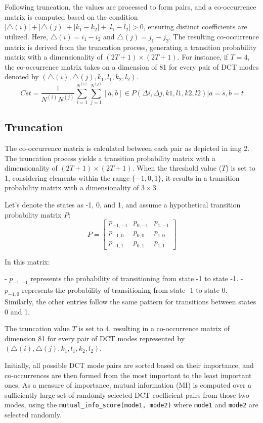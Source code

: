 Following truncation, the values are processed to form pairs, and a co-occurrence matrix is computed based on the condition $|\triangle(i)| + |\triangle(j)| + |k_1 - k_2| + |l_1 - l_2| > 0$, ensuring distinct coefficients are utilized. Here, $\triangle(i) = i_1 - i_2$ and $\triangle(j) = j_1 - j_2$. The resulting co-occurrence matrix is derived from the truncation process, generating a transition probability matrix with a dimensionality of $(2T + 1) \times (2T + 1)$. For instance, if $T = 4$, the co-occurrence matrix takes on a dimension of 81 for every pair of DCT modes denoted by $(\triangle(i), \triangle(j), k_1, l_1, k_2, l_2)$.
\[
    Cst = \frac{1}{N^{(i)}N^{(j)}} \sum_{i=1}^{N^{(i)}} \sum_{j=1}^{N^{(j)}} \left[ a, b \right] \in P (\Delta i, \Delta j, k1, l1, k2, l2) | a = s, b = t
\]

\subsection*{Truncation}
The co-occurrence matrix is calculated between each pair as depicted in img 2. The truncation process yields a transition probability matrix with a dimensionality of $(2T + 1) \times (2T + 1)$. When the threshold value ($T$) is set to 1, considering elements within the range $\{-1, 0, 1\}$, it results in a transition probability matrix with a dimensionality of $3 \times 3$.

Let's denote the states as -1, 0, and 1, and assume a hypothetical transition probability matrix $P$:
\[
    P = \begin{bmatrix}
        p_{-1,-1} & p_{0,-1} & p_{1,-1} \\
        p_{-1,0}  & p_{0,0}  & p_{1,0}  \\
        p_{-1,1}  & p_{0,1}  & p_{1,1}
    \end{bmatrix}
\]

In this matrix:

- $p_{-1,-1}$ represents the probability of transitioning from state -1 to state -1.
- $p_{-1,0}$ represents the probability of transitioning from state -1 to state 0.
- Similarly, the other entries follow the same pattern for transitions between states 0 and 1.

The truncation value $T$ is set to 4, resulting in a co-occurrence matrix of dimension 81 for every pair of DCT modes represented by $(\triangle(i), \triangle(j), k_1, l_1, k_2, l_2)$.

Initially, all possible DCT mode pairs are sorted based on their importance, and co-occurrences are then formed from the most important to the least important ones. As a measure of importance, mutual information (MI) is computed over a sufficiently large set of randomly selected DCT coefficient pairs from those two modes, using the \texttt{mutual\_info\_score(mode1, mode2)} where \texttt{mode1} and \texttt{mode2} are selected randomly.

